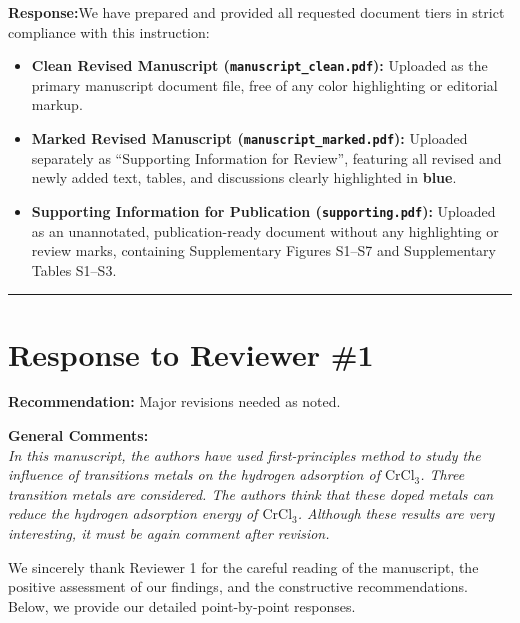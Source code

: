 \documentclass[11pt, sans, a4paper]{moderncv}
\newcommand{\response}{\vspace{0.4em}\noindent\textbf{\color{actionblue}Response:}\hspace{0.5em}}
\begin{document}
\begin{enumerate}[leftmargin=1.5em, itemsep=0.8em, label=\textbf{\arabic*.}]
\response We have prepared and provided all requested document tiers in strict compliance with this instruction:
\begin{itemize}[leftmargin=1.2em, itemsep=0.2em]
  \item \textbf{Clean Revised Manuscript (\texttt{manuscript\_clean.pdf}):} Uploaded as the primary manuscript document file, free of any color highlighting or editorial markup.
  \item \textbf{Marked Revised Manuscript (\texttt{manuscript\_marked.pdf}):} Uploaded separately as ``Supporting Information for Review'', featuring all revised and newly added text, tables, and discussions clearly highlighted in \textbf{\color{blue}blue}.
  \item \textbf{Supporting Information for Publication (\texttt{supporting.pdf}):} Uploaded as an unannotated, publication-ready document without any highlighting or review marks, containing Supplementary Figures S1--S7 and Supplementary Tables S1--S3.
\end{itemize}
\end{enumerate}

\vspace{1.5em}
\noindent\rule{\textwidth}{0.6pt}

\newpage
\section{Response to Reviewer \#1}

\noindent\textbf{Recommendation:} Major revisions needed as noted.

\vspace{0.5em}
\noindent\textbf{General Comments:}\\
\textit{In this manuscript, the authors have used first-principles method to study the influence of transitions metals on the hydrogen adsorption of $\text{CrCl}_3$. Three transition metals are considered. The authors think that these doped metals can reduce the hydrogen adsorption energy of $\text{CrCl}_3$. Although these results are very interesting, it must be again comment after revision.}

\vspace{0.5em}
\noindent We sincerely thank Reviewer 1 for the careful reading of the manuscript, the positive assessment of our findings, and the constructive recommendations. Below, we provide our detailed point-by-point responses.

\vspace{1em}
\end{document}
